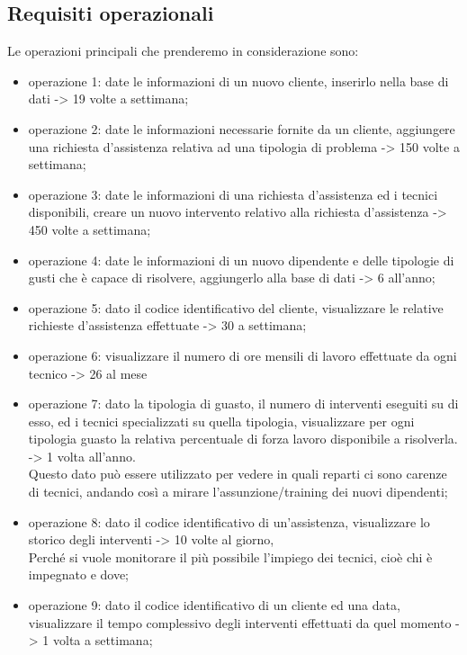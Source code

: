 \documentclass[legalpaper]{article}
\begin{document}
	\subsection{Requisiti operazionali}
	Le operazioni principali che prenderemo in considerazione sono:
	\begin{itemize}
		\item operazione 1: date le informazioni di un nuovo cliente, inserirlo nella base di dati -> 19 volte a settimana;
		\item operazione 2: date le informazioni necessarie fornite da un cliente, aggiungere una richiesta d'assistenza relativa ad una tipologia di problema -> 150 volte a settimana;
		\item operazione 3: date le informazioni di una richiesta d'assistenza ed i tecnici disponibili, creare un nuovo intervento relativo alla richiesta d'assistenza -> 450 volte a settimana;
		\item operazione 4: date le informazioni di un nuovo dipendente e delle tipologie di gusti che è capace di risolvere, aggiungerlo alla base di dati -> 6 all'anno;
		\item operazione 5: dato il codice identificativo del cliente, visualizzare le relative richieste d'assistenza effettuate -> 30 a settimana;
		\item operazione 6: 
		  visualizzare il numero di ore mensili di lavoro effettuate da ogni tecnico -> 26 al mese
		\item operazione 7: dato la tipologia di guasto, il numero di interventi eseguiti su di esso, ed i tecnici specializzati su quella tipologia, visualizzare per ogni tipologia guasto la relativa percentuale di forza lavoro disponibile a risolverla.  -> 1 volta all'anno. \\ Questo dato può essere utilizzato per vedere in quali reparti ci sono carenze di tecnici, andando così a mirare l'assunzione/training dei nuovi dipendenti;
		\item operazione 8: dato il codice identificativo di un'assistenza, visualizzare lo storico degli interventi -> 10 volte al giorno, \\ Perché si vuole monitorare il più possibile l'impiego dei tecnici, cioè chi è impegnato e dove;
		\item operazione 9: dato il codice identificativo di un cliente ed una data, visualizzare il tempo complessivo degli interventi effettuati da quel momento -> 1 volta a settimana;
		
	\end{itemize}
\end{document}
